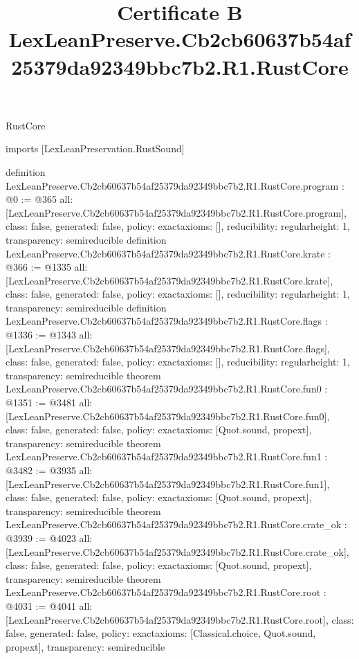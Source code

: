 \begin{lexlean}{RustCore}
\title{Certificate B LexLeanPreserve.Cb2cb60637b54af25379da92349bbc7b2.R1.RustCore}
\begin{coremodule}
imports [LexLeanPreservation.RustSound]

definition LexLeanPreserve.Cb2cb60637b54af25379da92349bbc7b2.R1.RustCore.program : @0 := @365 {
  all: [LexLeanPreserve.Cb2cb60637b54af25379da92349bbc7b2.R1.RustCore.program],
  class: false,
  generated: false,
  policy: exact{axioms: []},
  reducibility: regular{height: 1},
  transparency: semireducible
}
definition LexLeanPreserve.Cb2cb60637b54af25379da92349bbc7b2.R1.RustCore.krate : @366 := @1335 {
  all: [LexLeanPreserve.Cb2cb60637b54af25379da92349bbc7b2.R1.RustCore.krate],
  class: false,
  generated: false,
  policy: exact{axioms: []},
  reducibility: regular{height: 1},
  transparency: semireducible
}
definition LexLeanPreserve.Cb2cb60637b54af25379da92349bbc7b2.R1.RustCore.flags : @1336 := @1343 {
  all: [LexLeanPreserve.Cb2cb60637b54af25379da92349bbc7b2.R1.RustCore.flags],
  class: false,
  generated: false,
  policy: exact{axioms: []},
  reducibility: regular{height: 1},
  transparency: semireducible
}
theorem LexLeanPreserve.Cb2cb60637b54af25379da92349bbc7b2.R1.RustCore.fun0 : @1351 := @3481 {
  all: [LexLeanPreserve.Cb2cb60637b54af25379da92349bbc7b2.R1.RustCore.fun0],
  class: false,
  generated: false,
  policy: exact{axioms: [Quot.sound, propext]},
  transparency: semireducible
}
theorem LexLeanPreserve.Cb2cb60637b54af25379da92349bbc7b2.R1.RustCore.fun1 : @3482 := @3935 {
  all: [LexLeanPreserve.Cb2cb60637b54af25379da92349bbc7b2.R1.RustCore.fun1],
  class: false,
  generated: false,
  policy: exact{axioms: [Quot.sound, propext]},
  transparency: semireducible
}
theorem LexLeanPreserve.Cb2cb60637b54af25379da92349bbc7b2.R1.RustCore.crate_ok : @3939 := @4023 {
  all: [LexLeanPreserve.Cb2cb60637b54af25379da92349bbc7b2.R1.RustCore.crate_ok],
  class: false,
  generated: false,
  policy: exact{axioms: [Quot.sound, propext]},
  transparency: semireducible
}
theorem LexLeanPreserve.Cb2cb60637b54af25379da92349bbc7b2.R1.RustCore.root : @4031 := @4041 {
  all: [LexLeanPreserve.Cb2cb60637b54af25379da92349bbc7b2.R1.RustCore.root],
  class: false,
  generated: false,
  policy: exact{axioms: [Classical.choice, Quot.sound, propext]},
  transparency: semireducible
}


\end{coremodule}
\end{lexlean}
